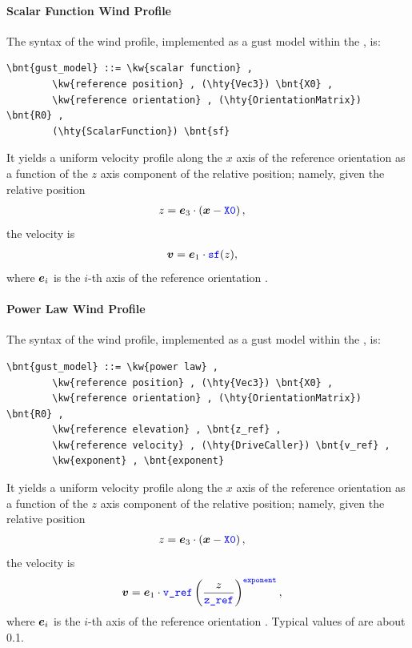 


\paragraph{Scalar Function Wind Profile}
The syntax of the  wind profile,
implemented as a gust model within the , is:
\begin{Verbatim}[commandchars=\\\{\}]
    \bnt{gust_model} ::= \kw{scalar function} ,
        \kw{reference position} , (\hty{Vec3}) \bnt{X0} ,
        \kw{reference orientation} , (\hty{OrientationMatrix}) \bnt{R0} ,
        (\hty{ScalarFunction}) \bnt{sf}
\end{Verbatim}
It yields a uniform velocity profile along the $x$ axis of the
reference orientation as a function of the $z$ axis component
of the relative position; namely, given the relative position
\begin{align}
	z &= \boldsymbol{e}_3 \cdot \left( \boldsymbol{x} - \textcolor{blue}{\texttt{X0}} \right)
	,
\end{align}
the velocity is
\begin{align}
	\boldsymbol{v}
	&=
	\boldsymbol{e}_1 \cdot \textcolor{blue}{\texttt{sf}}(z)
	,
\end{align}
where $\boldsymbol{e}_i$ is the $i$-th axis of the reference orientation .



\paragraph{Power Law Wind Profile}
The syntax of the  wind profile, implemented as a gust model
within the , is:
\begin{Verbatim}[commandchars=\\\{\}]
    \bnt{gust_model} ::= \kw{power law} ,
        \kw{reference position} , (\hty{Vec3}) \bnt{X0} ,
        \kw{reference orientation} , (\hty{OrientationMatrix}) \bnt{R0} ,
        \kw{reference elevation} , \bnt{z_ref} ,
        \kw{reference velocity} , (\hty{DriveCaller}) \bnt{v_ref} ,
        \kw{exponent} , \bnt{exponent}
\end{Verbatim}
It yields a uniform velocity profile along the $x$ axis of the
reference orientation as a function of the $z$ axis component
of the relative position; namely, given the relative position
\begin{align}
	z &= \boldsymbol{e}_3 \cdot \left( \boldsymbol{x} - \textcolor{blue}{\texttt{X0}} \right)
	,
\end{align}
the velocity is
\begin{align}
	\boldsymbol{v}
	&=
	\boldsymbol{e}_1 \cdot \textcolor{blue}{\texttt{v\_ref}} \left( \frac{z}{\textcolor{blue}{\texttt{z\_ref}}} \right)^{\textcolor{blue}{\texttt{exponent}}}
	,
\end{align}
where $\boldsymbol{e}_i$ is the $i$-th axis of the reference orientation .
Typical values of  are about 0.1.



